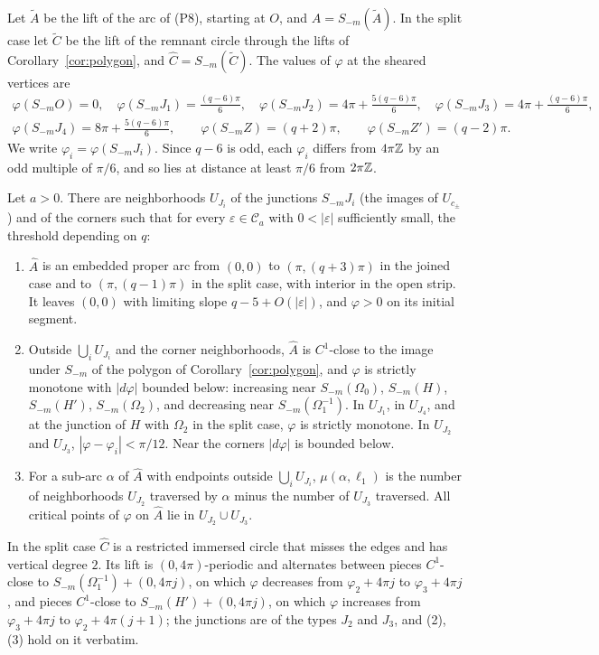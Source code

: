 Let $\tilde A$ be the lift of the arc of (P8), starting at $O$, and $\hat A=S_{-m}(\tilde A)$. In the split case let
$\tilde C$ be the lift of the remnant circle through the lifts of Corollary~\ref{cor:polygon}, and $\hat C=S_{-m}(\tilde C)$. The values of
$\varphi$ at the sheared vertices are
\begin{equation}\label{eq:phiJ}
\begin{gathered}
\varphi(S_{-m}O)=0,\quad \varphi(S_{-m}J_1)=\tfrac{(q-6)\pi}6,\quad \varphi(S_{-m}J_2)=4\pi+\tfrac{5(q-6)\pi}6,\quad \varphi(S_{-m}J_3)=4\pi+\tfrac{(q-6)\pi}6,\\
\varphi(S_{-m}J_4)=8\pi+\tfrac{5(q-6)\pi}6,\qquad \varphi(S_{-m}Z)=(q+2)\pi,\qquad \varphi(S_{-m}Z')=(q-2)\pi .
\end{gathered}
\end{equation}
We write $\varphi_i=\varphi(S_{-m}J_i)$. Since $q-6$ is odd, each $\varphi_i$ differs from $4\pi\mathbb{Z}$ by an odd multiple of $\pi/6$, and so
lies at distance at least $\pi/6$ from $2\pi\mathbb{Z}$.

\begin{proposition}\label{prop:shearedcurves}
Let $a>0$. There are neighborhoods $U_{J_i}$ of the junctions $S_{-m}J_i$ (the images of $U_{c_\pm}$) and of the corners such
that for every $\varepsilon\in\mathcal C_a$ with $0<|\varepsilon|$ sufficiently small, the threshold depending on $q$:
\begin{enumerate}
\item $\hat A$ is an embedded proper arc from $(0,0)$ to $(\pi,(q+3)\pi)$ in the joined case and to $(\pi,(q-1)\pi)$ in
the split case, with interior in the open strip. It leaves $(0,0)$ with limiting slope $q-5+O(|\varepsilon|)$, and $\varphi>0$ on
its initial segment.
\item Outside $\bigcup_iU_{J_i}$ and the corner neighborhoods, $\hat A$ is $C^1$-close to the image under $S_{-m}$ of the polygon
of Corollary~\ref{cor:polygon}, and $\varphi$ is strictly monotone with $|d\varphi|$ bounded below: increasing near
$S_{-m}(\Omega_0)$, $S_{-m}(H)$, $S_{-m}(H')$, $S_{-m}(\Omega_2)$, and decreasing near $S_{-m}(\Omega_1^{-1})$. In $U_{J_1}$, in $U_{J_4}$, and at the
junction of $H$ with $\Omega_2$ in the split case, $\varphi$ is strictly monotone. In $U_{J_2}$ and $U_{J_3}$,
$|\varphi-\varphi_i|<\pi/12$. Near the corners $|d\varphi|$ is bounded below.
\item For a sub-arc $\alpha$ of $\hat A$ with endpoints outside $\bigcup_iU_{J_i}$, $\mu(\alpha,\ell_1)$ is the number of
neighborhoods $U_{J_2}$ traversed by $\alpha$ minus the number of $U_{J_3}$ traversed. All critical points of $\varphi$ on $\hat A$
lie in $U_{J_2}\cup U_{J_3}$.
\end{enumerate}
In the split case $\hat C$ is a restricted immersed circle that misses the edges and has vertical degree $2$. Its lift
is $(0,4\pi)$-periodic and alternates between pieces $C^1$-close to $S_{-m}(\Omega_1^{-1})+(0,4\pi j)$, on which $\varphi$ decreases from
$\varphi_2+4\pi j$ to $\varphi_3+4\pi j$, and pieces $C^1$-close to $S_{-m}(H')+(0,4\pi j)$, on which $\varphi$ increases from
$\varphi_3+4\pi j$ to $\varphi_2+4\pi(j+1)$; the junctions are of the types $J_2$ and $J_3$, and (2), (3) hold on it verbatim.
\end{proposition}

